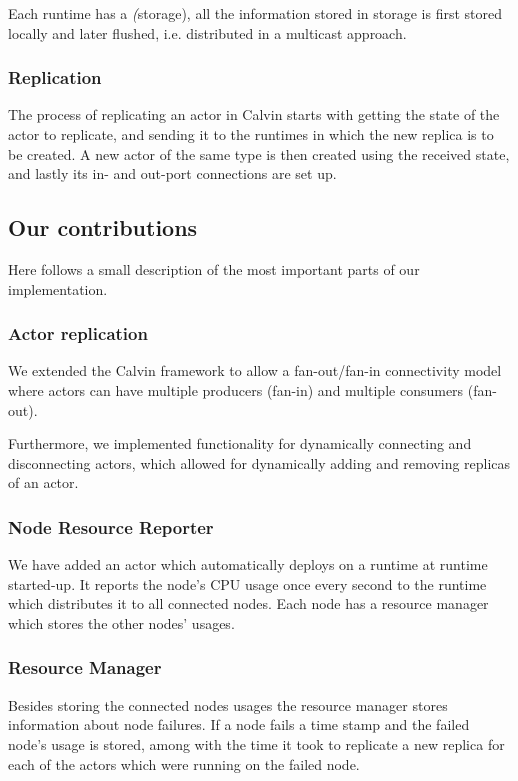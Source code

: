 \documentclass{cslthse-msc}
\begin{document}
Each runtime has a \emph(storage), all the information stored in storage is first stored locally and later flushed, i.e. distributed in a multicast approach.

\subsubsection{Replication} \label{subsec:calvin_replication}
The process of replicating an actor in Calvin starts with getting the state of the actor to replicate, and sending it to the runtimes in which the new replica is to be created. A new actor of the same type is then created using the received state, and lastly its in- and out-port connections are set up.

\subsection{Our contributions} \label{subsec:design_contributions} %
Here follows a small description of the most important parts of our implementation.

\subsubsection{Actor replication}
We extended the Calvin framework to allow a fan-out/fan-in connectivity model where actors can have multiple producers (fan-in) and multiple consumers (fan-out). 

Furthermore, we implemented functionality for dynamically connecting and disconnecting actors, which allowed for dynamically adding and removing replicas of an actor.


\subsubsection{Node Resource Reporter}
We have added an actor which automatically deploys on a runtime at runtime started-up. It reports the node's CPU usage once every second to the runtime which distributes it to all connected nodes. Each node has a resource manager which stores the other nodes' usages.


\subsubsection{Resource Manager}
Besides storing the connected nodes usages the resource manager stores information about node failures. If a node fails a time stamp and the failed node's usage is stored, among with the time it took to replicate a new replica for each of the actors which were running on the failed node.
\end{document}
